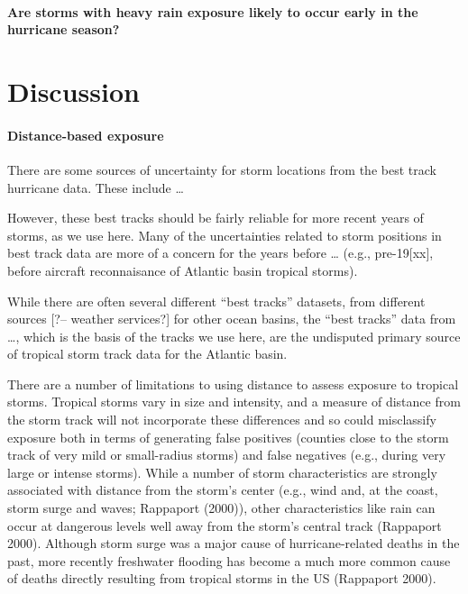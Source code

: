 \documentclass[]{elsarticle} %
\begin{document}
\paragraph{Are storms with heavy rain exposure likely to occur early in
the hurricane
season?}\label{are-storms-with-heavy-rain-exposure-likely-to-occur-early-in-the-hurricane-season}

\section{Discussion}\label{discussion}

\paragraph{Distance-based exposure}\label{distance-based-exposure-1}

There are some sources of uncertainty for storm locations from the best
track hurricane data. These include \ldots{}

However, these best tracks should be fairly reliable for more recent
years of storms, as we use here. Many of the uncertainties related to
storm positions in best track data are more of a concern for the years
before \ldots{} (e.g., pre-19{[}xx{]}, before aircraft reconnaisance of
Atlantic basin tropical storms).

While there are often several different ``best tracks'' datasets, from
different sources {[}?-- weather services?{]} for other ocean basins,
the ``best tracks'' data from \ldots{}, which is the basis of the tracks
we use here, are the undisputed primary source of tropical storm track
data for the Atlantic basin.

There are a number of limitations to using distance to assess exposure
to tropical storms. Tropical storms vary in size and intensity, and a
measure of distance from the storm track will not incorporate these
differences and so could misclassify exposure both in terms of
generating false positives (counties close to the storm track of very
mild or small-radius storms) and false negatives (e.g., during very
large or intense storms). While a number of storm characteristics are
strongly associated with distance from the storm's center (e.g., wind
and, at the coast, storm surge and waves; Rappaport (2000)), other
characteristics like rain can occur at dangerous levels well away from
the storm's central track (Rappaport 2000). Although storm surge was a
major cause of hurricane-related deaths in the past, more recently
freshwater flooding has become a much more common cause of deaths
directly resulting from tropical storms in the US (Rappaport 2000).
\end{document}
